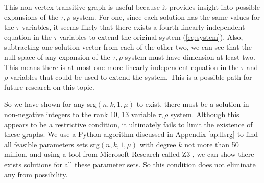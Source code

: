 \documentclass[12pt]{report}
\theoremstyle{definition}
\begin{document}
This non-vertex transitive graph is useful because it provides insight into possible expansions of the $\tau,\rho$ system. For one, since each solution has the same values for the $\tau$ variables, it seems likely that there exists a fourth linearly independent equation in the $\tau$ variables to extend the original system (\ref{eq:system}). Also, subtracting one solution vector from each of the other two, we can see that the null-space of any expansion of the $\tau,\rho$ system must have dimension at least two. This means there is at most one more linearly independent equation in the $\tau$ and $\rho$ variables that could be used to extend the system. This is a possible path for future research on this topic.\par
So we have shown for any srg$(n,k,1,\mu)$ to exist, there must be a solution in non-negative integers to the rank 10, 13 variable $\tau,\rho$ system. Although this appears to be a restrictive condition, it ultimately fails to limit the existence of these graphs. We use a Python algorithm discussed in Appendix \ref{ap:llsrg} to find all feasible parameters sets srg$(n,k,1,\mu)$ with degree $k$ not more than 50 million, and using a tool from Microsoft Research called Z3 \cite{z3}, we can show there exists solutions for all these parameter sets. So this condition does not eliminate any from possibility.

\end{document}
